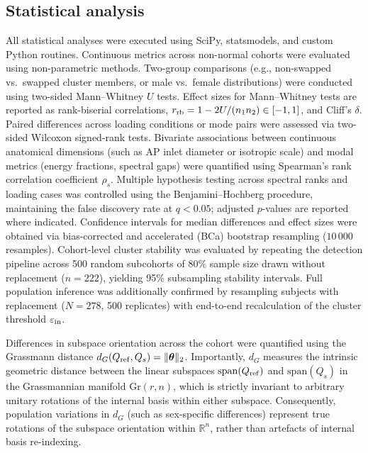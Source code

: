 \documentclass[11pt]{article}
\begin{document}
\subsection{Statistical analysis}
\label{sec:statistics}

All statistical analyses were executed using SciPy, statsmodels, and custom Python routines.
Continuous metrics across non-normal cohorts were evaluated using non-parametric methods.
Two-group comparisons (e.g., non-swapped vs.\ swapped cluster members, or male vs.\ female distributions) were conducted using two-sided Mann--Whitney $U$ tests.
Effect sizes for Mann--Whitney tests are reported as rank-biserial correlations, $r_{\rm rb} = 1 - 2U / (n_1 n_2) \in [-1, 1]$, and Cliff's $\delta$.
Paired differences across loading conditions or mode pairs were assessed via two-sided Wilcoxon signed-rank tests.
Bivariate associations between continuous anatomical dimensions (such as AP inlet diameter or isotropic scale) and modal metrics (energy fractions, spectral gaps) were quantified using Spearman's rank correlation coefficient $\rho_s$.
Multiple hypothesis testing across spectral ranks and loading cases was controlled using the Benjamini--Hochberg procedure, maintaining the false discovery rate at $q < 0.05$; adjusted $p$-values are reported where indicated.
Confidence intervals for median differences and effect sizes were obtained via bias-corrected and accelerated (BCa) bootstrap resampling ($10\,000$ resamples).
Cohort-level cluster stability was evaluated by repeating the detection pipeline across 500 random subcohorts of 80\% sample size drawn without replacement ($n = 222$), yielding 95\% subsampling stability intervals.
Full population inference was additionally confirmed by resampling subjects with replacement ($N = 278$, 500 replicates) with end-to-end recalculation of the cluster threshold $\varepsilon_{\rm in}$.

Differences in subspace orientation across the cohort were quantified using the Grassmann distance $d_G(Q_{\rm ref}, Q_s) = \|\boldsymbol\theta\|_2$.
Importantly, $d_G$ measures the intrinsic geometric distance between the linear subspaces $\mathrm{span}(Q_{\rm ref})$ and $\mathrm{span}(Q_s)$ in the Grassmannian manifold $\mathrm{Gr}(r, n)$, which is strictly invariant to arbitrary unitary rotations of the internal basis within either subspace.
Consequently, population variations in $d_G$ (such as sex-specific differences) represent true rotations of the subspace orientation within $\mathbb R^n$, rather than artefacts of internal basis re-indexing.
\end{document}
